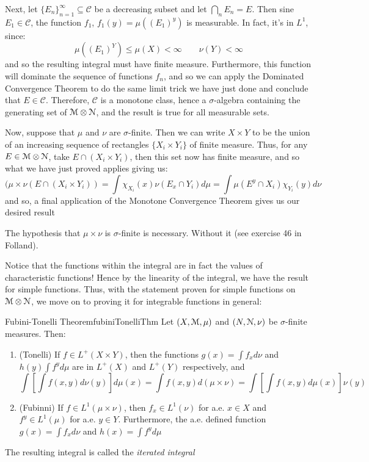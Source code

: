 \documentclass[oneside]{book}
\newcommand{\EM}{\EuScript{M}}
\newcommand{\EN}{\EuScript{N}}
\newcommand{\CC}{\mathcal{C}}
\newcommand{\sse}{\subseteq}
\begin{document}
\begin{Proof}
	Next, let $\{E_n\}_{n=1}^\infty \sse \CC$ be a decreasing subset and let $\bigcap_n E_n = E$. Then sine $E_1 \in
	\CC$, the function $f_1$, $f_1(y) = \mu((E_1)^y)$ is measurable. In fact, it's in $L^1$, since:
	\[
		\mu((E_1)^Y) \le \mu(X) < \infty \qquad \nu(Y) < \infty
	\]
	and so the resulting integral must have finite measure. Furthermore, this function will dominate the sequence of
	functions $f_n$, and so we can apply the Dominated Convergence Theorem to do the same limit trick we have just done
	and conclude that $E \in \CC$. Therefore, $\CC$ is a monotone class, hence a $\sigma$-algebra containing the
	generating set of $\EM\otimes\EN$, and the result is true for all measurable sets. 

	Now, suppose that $\mu$ and $\nu$ are $\sigma$-finite. Then we can write $X\times Y$ to be the union of an
	increasing sequence of rectangles $\{X_i\times Y_i\}$ of finite measure. Thus, for any $E \in \EM\otimes \EN$, take
	$E\cap (X_i\times Y_i)$, then this set now has finite measure, and so what we have just proved applies giving us:
	\[
		(\mu\times\nu(E\cap (X_i\times Y_i)) = \int \chi_{X_i}(x)\nu(E_x\cap Y_i)d\mu = \int \mu(E^y\cap
		X_i)\chi_{Y_i}(y)d\nu
	\]
	and so, a final application of the Monotone Convergence Theorem gives us our desired result
\end{Proof}

The hypothesis that $\mu\times \nu$ is $\sigma$-finite is necessary. Without it (see exercise 46 in Folland).

Notice that the functions within the integral are in fact the values of characteristic functions! Hence by the linearity
of the integral, we have the result for simple functions. Thus, with the statement proven for simple functions on
$\EM\otimes\EN$, we move on to proving it for integrable functions in general:

\begin{thm}{Fubini-Tonelli Theorem}{fubiniTonelliThm}
	Let $(X, \EM, \mu)$ and $(N, \EN, \nu)$ be $\sigma$-finite measures. Then:
	\begin{enumerate}
		\item (Tonelli) If $f \in L^+(X\times Y)$, then the functions $g(x) = \int f_xd\nu$ and $h(y) \int f^yd\mu$ are
			in $L^+(X)$ and $L^+(Y)$ respectively, and 
			\[
				\int \left[\int f(x,y)d\nu(y)\right]d\mu(x) = \int f(x,y)d(\mu\times \nu) = \int\left[\int
				f(x,y)d\mu(x)\right]\nu(y)
			\]
		\item (Fubinni) If $f \in L^1(\mu\times \nu)$, then $f_x \in L^1(\nu)$ for a.e. $x \in X$ and $f^y \in L^1(\mu)$
			for a.e. $y \in Y$. Furthermore, the a.e. defined function $g(x) = \int f_xd\nu$ and $h(x) = \int f^yd\mu$
	\end{enumerate}
	The resulting integral is called the \emph{iterated integral}
\end{thm}
\end{document}
